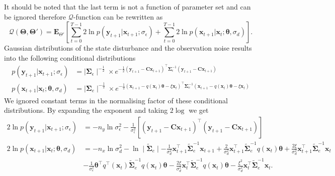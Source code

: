 \documentclass[]{article}
\begin{document}
 It should be noted that the last term is not a function of parameter set and can be ignored therefore $\mathcal Q$-function can be rewritten as
\begin{equation}\label{eq:QIntermsofJointDist}
\mathcal Q(\boldsymbol \Theta,\boldsymbol\Theta')=\mathbf E_{\Theta'}\left[\sum_{t=0}^{T-1}2\ln p(\mathbf y_{t+1}|\mathbf x_{t+1}; \sigma_{\epsilon})+\sum_{t=0}^{T-1}2\ln p(\mathbf x_{t+1}|\mathbf x_{t};\boldsymbol \theta ,\sigma_d)\right].
\end{equation}
Gaussian distributions of the state disturbance and the observation noise results into the following conditional distributions
\begin{align}
 p\left(\mathbf y_{t+1}|\mathbf x_{t+1};\sigma_{\epsilon}\right)&= \mid\boldsymbol\Sigma_{\epsilon}\mid^{-\frac{1}{2}} \times  e^{-\frac{1}{2}(\mathbf y_{t+1}-\mathbf C\mathbf  x_{t+1})^\top\boldsymbol\Sigma_{\epsilon}^{-1}(\mathbf y_{t+1}-\mathbf C\mathbf  x_{t+1}) } \\
p(\mathbf x_{t+1}|\mathbf x_{t};\boldsymbol \theta ,\sigma_d)&= \mid\boldsymbol\Sigma_{e}\mid^{-\frac{1}{2}} \times e^{-\frac{1}{2}(\mathbf x_{t+1}-q(\mathbf  x_t)\boldsymbol\theta-\xi  \mathbf x_t)^\top\boldsymbol\Sigma_e^{-1}(\mathbf x_{t+1}-q( \mathbf x_t)\boldsymbol\theta-\xi \mathbf  x_t)}
\end{align}
We ignored constant terms in the normalising factor of these conditional distributions. By expanding the exponent and taking $2\log$ we get
\begin{align}\label{eq:CondititionDist1}
2\ln p\left(\mathbf y_{t+1}|\mathbf x_{t+1};\sigma_{\epsilon}\right)&=-n_y\ln \sigma_{\epsilon}^2-\frac{1}{\sigma_{\epsilon}^2}\left[ (\mathbf y_{t+1}-\mathbf C\mathbf  x_{t+1})^\top(\mathbf y_{t+1}-\mathbf C\mathbf  x_{t+1})\right]  \\
2\ln p(\mathbf x_{t+1}|\mathbf x_{t};\boldsymbol \theta ,\sigma_d)&=-n_x\ln\sigma_d^2-\ln\mid\tilde{\boldsymbol\Sigma}_e\mid-\frac{1}{\sigma_d^2}\mathbf x_{t+1}^\top\tilde{\boldsymbol\Sigma}_e^{-1}\mathbf x_{t+1}+\frac{2}{\sigma_d^2}\mathbf x_{t+1}^\top\tilde{\boldsymbol\Sigma}_e^{-1}q( \mathbf x_t)\boldsymbol\theta+\frac{2\xi}{\sigma_d^2}\mathbf x_{t+1}^\top\tilde{\boldsymbol\Sigma}_e^{-1}\mathbf x_t \nonumber \\
&-\frac{1}{\sigma_e^2}\boldsymbol\theta^\top q^\top(\mathbf x_t)\tilde{\boldsymbol\Sigma}_e^{-1}q(\mathbf x_t)\boldsymbol\theta-\frac{2\xi}{\sigma_d^2} \mathbf x_t^\top\tilde{\boldsymbol\Sigma}_e^{-1}q(\mathbf x_t)\boldsymbol\theta-\frac{\xi^2}{\sigma_d^2}\mathbf x_t^\top\tilde{\boldsymbol\Sigma}_e^{-1}\mathbf x_t. \label{eq:CondititionDist2}
\end{align}
\end{document}
